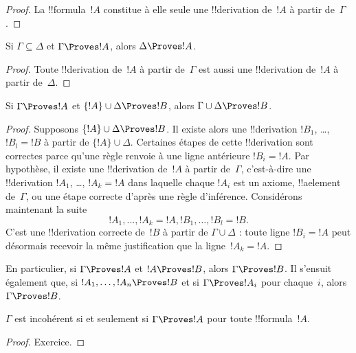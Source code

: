 \documentclass[11pt,a4paper,openany]{memoir}
\begin{document}
\begin{proof}
La !!{formula}~$!A$ constitue à elle seule une !!{derivation} de~$!A$
à partir de~$\Gamma$.
\end{proof}

\begin{prop}[Monotonie]
Si $\Gamma \subseteq \Delta$ et $\Gamma \Proves !A$, alors
$\Delta \Proves !A$.
\end{prop}

\begin{proof}
Toute !!{derivation} de~$!A$ à partir de~$\Gamma$ est aussi une
!!{derivation} de~$!A$ à partir de~$\Delta$.
\end{proof}

\begin{prop}[Transitivité]
Si $\Gamma \Proves !A$ et $\{!A\} \cup \Delta \Proves !B$, alors
$\Gamma \cup \Delta \Proves !B$.
\end{prop}

\begin{proof}
Supposons $\{!A\} \cup \Delta \Proves !B$. Il existe alors une
!!{derivation} $!B_1$, \dots, $!B_l = !B$ à partir de
$\{!A\} \cup \Delta$. Certaines étapes de cette !!{derivation} sont
correctes parce qu'une règle renvoie à une ligne antérieure
$!B_i = !A$. Par hypothèse, il existe une !!{derivation} de~$!A$ à
partir de~$\Gamma$, c'est-à-dire une !!{derivation} $!A_1$, \dots,
$!A_k = !A$ dans laquelle chaque $!A_i$ est un axiome, !!a{element}
de~$\Gamma$, ou une étape correcte d'après une règle d'inférence.
Considérons maintenant la suite
\[
!A_1, \dots, !A_k = !A, !B_1, \dots, !B_l = !B.
\]
C'est une !!{derivation} correcte de~$!B$ à partir de
$\Gamma \cup \Delta$ : toute ligne $!B_i = !A$ peut désormais recevoir
la même justification que la ligne~$!A_k = !A$.
\end{proof}

En particulier, si $\Gamma \Proves !A$ et $!A \Proves !B$, alors
$\Gamma \Proves !B$. Il s'ensuit également que, si
$!A_1, \dots, !A_n \Proves !B$ et si $\Gamma \Proves !A_i$ pour
chaque~$i$, alors $\Gamma \Proves !B$.

\begin{prop}
$\Gamma$ est incohérent si et seulement si
$\Gamma \Proves !A$ pour toute !!{formula}~$!A$.
\end{prop}

\begin{proof}
Exercice.
\end{proof}
\end{document}
